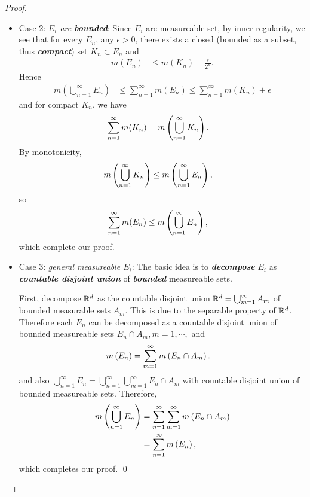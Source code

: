 \documentclass[11pt]{article}
\begin{document}
\begin{itemize}
\begin{proof}
\begin{itemize}
\item  Case 2: \emph{$E_{i}$ are \textbf{bounded}}:  Since $E_{i}$ are measureable set, by inner regularity, we see that for every $E_{n}$,  any $\epsilon>0$, there exists a closed (bounded as a subset, thus \emph{\textbf{compact}}) set $K_{n}\subset E_{n}$ and 
\begin{align*}
m(E_{n}) &\le m(K_{n})+ \frac{\epsilon}{2^{n}}.
\end{align*} 
Hence 
\begin{align*}
m(\bigcup_{n=1}^{\infty}E_{n}) &\le \sum_{n=1}^{\infty}m(E_{n}) \le \sum_{n=1}^{\infty}m(K_{n})+ \epsilon
\end{align*}
and for compact $K_{n}$, we have
\begin{align*}
\sum_{n=1}^{\infty}m(K_{n})&= m\left(\bigcup_{n=1}^{\infty}K_{n}\right).
\end{align*} 
By monotonicity, 
\begin{align*}
m\left(\bigcup_{n=1}^{\infty}K_{n}\right) &\le m\left(\bigcup_{n=1}^{\infty}E_{n}\right),
\end{align*}
so 
\begin{align*}
 \sum_{n=1}^{\infty}m(E_{n}) &\le m\left(\bigcup_{n=1}^{\infty}E_{n}\right),
\end{align*}
which complete our proof. 

\item Case 3: \emph{general measureable $E_{i}$}:  The basic idea is to \emph{\textbf{decompose}} $E_{i}$ as \emph{\textbf{countable disjoint union}} of \emph{\textbf{bounded}} measureable sets. 

First, decompose ${\mathbb R}^{d}$ as the countable disjoint union ${\mathbb R}^{d} = \bigcup_{m=1}^{\infty}A_{m}$ of bounded measurable sets $A_{m}$. This is due to the separable property of ${\mathbb R}^{d}$. Therefore each $E_{n}$ can be decomposed as a countable disjoint union of bounded measureable sets $E_{n}\cap A_{m}, m=1,\cdots,$ and 
\begin{align*}
m\left(E_{n}\right) &= \sum_{m=1}^{\infty}m\left(E_{n}\cap A_{m}\right).
\end{align*}
and also $\bigcup_{n=1}^{\infty}E_{n}= \bigcup_{n=1}^{\infty}\bigcup_{m=1}^{\infty}E_{n}\cap A_{m}$ with countable disjoint union of bounded measureable sets. Therefore, 
\begin{align*}
m\left(\bigcup_{n=1}^{\infty}E_{n}\right) &= \sum_{n=1}^{\infty}\sum_{m=1}^{\infty}m\left(E_{n}\cap A_{m}\right)\\
&= \sum_{n=1}^{\infty}m\left(E_{n}\right) ,
\end{align*} which completes our proof. \qed
\end{itemize}
\end{proof}


\end{itemize}
\end{document}
